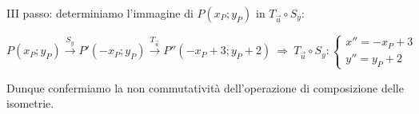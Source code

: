 III passo: determiniamo l'immagine di $P(x_P;y_P)$ in 
$T_{\vec{u}}\circ S_y$:

\[P(x_P;y_P)\overset{S_y}\rightarrow P'(-x_P;y_P) 
\overset{T_{\vec{u}}}\rightarrow P''(-x_P+3;y_P+2)\:\Rightarrow\: 
T_{\vec{u}}\circ S_y:\begin{cases}x''=-x_P+3\\ y''=y_P+2\end{cases}\]

Dunque confermiamo la non commutatività dell'operazione di 
composizione delle isometrie.

% 
% 
% 
% 
